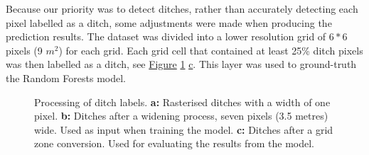 \documentclass[]{interact}
\theoremstyle{plain}%
\theoremstyle{definition}
\theoremstyle{remark}
\begin{document}
Because our priority was to detect ditches, rather than accurately detecting each pixel labelled as a ditch, some adjustments were made when producing the prediction results. The dataset was divided into a lower resolution grid of $6*6$ pixels (9 $m^2$) for each grid. Each grid cell that contained at least 25\% ditch pixels was then labelled as a ditch, see \hyperref[fig:ditchpreprocess]{Figure} \ref{fig:ditchpreprocess} \hyperref[fig:ditchpreprocess]{c}. This layer was used to ground-truth the Random Forests model.

\begin{figure} [htb!]
    \centering
    \hspace{5pt}
    \caption{Processing of ditch labels. \textbf{a: }Rasterised ditches with a width of one pixel. \textbf{b: }Ditches after a widening process, seven pixels (3.5 metres) wide. Used as input when training the model. \textbf{c: }Ditches after a grid zone conversion. Used for evaluating the results from the model.} \label{sample-figure}
    \label{fig:ditchpreprocess}
\end{figure}
\end{document}
